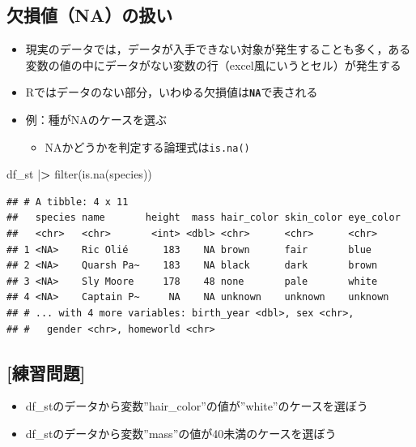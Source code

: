 \documentclass[
  xelatex,ja=standard, b5paper]{bxjsbook}
\newenvironment{Shaded}{\begin{snugshade}}{\end{snugshade}}
\newcommand{\ErrorTok}[1]{\textcolor[rgb]{0.64,0.00,0.00}{\textbf{#1}}}
\newcommand{\FunctionTok}[1]{\textcolor[rgb]{0.00,0.00,0.00}{#1}}
\newcommand{\NormalTok}[1]{#1}
\newcommand{\SpecialCharTok}[1]{\textcolor[rgb]{0.00,0.00,0.00}{#1}}
\providecommand{\tightlist}{%
  \setlength{\itemsep}{0pt}\setlength{\parskip}{0pt}}
\begin{document}
\hypertarget{filter-st-na}{%
\subsection{欠損値（NA）の扱い}\label{filter-st-na}}

\begin{itemize}
\item
  現実のデータでは，データが入手できない対象が発生することも多く，ある変数の値の中にデータがない変数の行（excel風にいうとセル）が発生する
\item
  Rではデータのない部分，いわゆる欠損値は\textbf{\texttt{NA}}で表される
\item
  例：種がNAのケースを選ぶ

  \begin{itemize}
  \tightlist
  \item
    NAかどうかを判定する論理式は\texttt{is.na()}
  \end{itemize}
\end{itemize}

\begin{Shaded}
\begin{Highlighting}[]
\NormalTok{df\_st }\SpecialCharTok{|}\ErrorTok{\textgreater{}} 
  \FunctionTok{filter}\NormalTok{(}\FunctionTok{is.na}\NormalTok{(species))}
\end{Highlighting}
\end{Shaded}

\begin{verbatim}
## # A tibble: 4 x 11
##   species name       height  mass hair_color skin_color eye_color
##   <chr>   <chr>       <int> <dbl> <chr>      <chr>      <chr>    
## 1 <NA>    Ric Olié      183    NA brown      fair       blue     
## 2 <NA>    Quarsh Pa~    183    NA black      dark       brown    
## 3 <NA>    Sly Moore     178    48 none       pale       white    
## 4 <NA>    Captain P~     NA    NA unknown    unknown    unknown  
## # ... with 4 more variables: birth_year <dbl>, sex <chr>,
## #   gender <chr>, homeworld <chr>
\end{verbatim}

\hypertarget{ux7df4ux7fd2ux554fux984c-6}{%
\subsection{{[}練習問題{]}}\label{ux7df4ux7fd2ux554fux984c-6}}

\begin{itemize}
\tightlist
\item
  df\_stのデータから変数''hair\_color''の値が''white''のケースを選ぼう
\item
  df\_stのデータから変数''mass''の値が40未満のケースを選ぼう
\end{itemize}
\end{document}
